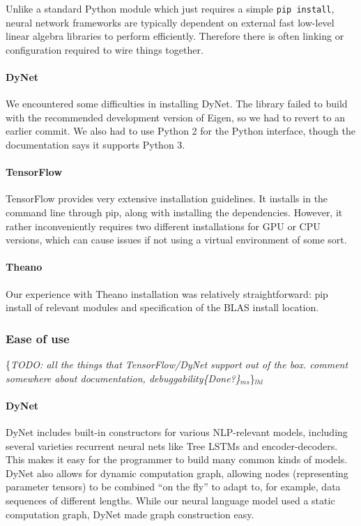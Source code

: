 \documentclass{article}
\newcommand{\ms}[1]{{\color{cyan}\{\textit{#1}\}$_{ms}$}}
\newcommand{\lhl}[1]{{\color{magenta}\{\textit{#1}\}$_{lhl}$}}
\begin{document}
Unlike a standard Python module which just requires a simple \texttt{pip install}, neural network frameworks are typically dependent on external fast low-level linear algebra libraries to perform efficiently. Therefore there is often linking or configuration required to wire things together.

\paragraph{DyNet} We encountered some difficulties in installing DyNet. The library failed to build with the recommended development version of Eigen, so we had to revert to an earlier commit. We also had to use Python 2 for the Python interface, though the documentation says it supports Python 3.

\paragraph{TensorFlow}
TensorFlow provides very extensive installation guidelines. It installs in the command line through pip, along with installing the dependencies. However, it rather inconveniently requires two different installations for GPU or CPU versions, which can cause issues if not using a virtual environment of some sort.

\paragraph{Theano} Our experience with Theano installation was relatively straightforward: pip install of relevant modules and specification of the BLAS install location.

\subsubsection{Ease of use}
\lhl{TODO: all the things that TensorFlow/DyNet support out of the box.
comment somewhere about documentation, debuggability\ms{Done?}}

\paragraph{DyNet}
DyNet includes built-in constructors for various NLP-relevant models, including several varieties recurrent neural nets like Tree LSTMs and encoder-decoders. This makes it easy for the programmer to build many common kinds of models. DyNet also allows for dynamic computation graph, allowing nodes (representing parameter tensors) to be combined ``on the fly'' to adapt to, for example, data sequences of different lengths. While our neural language model used a static computation graph, DyNet made graph construction easy.
\end{document}
